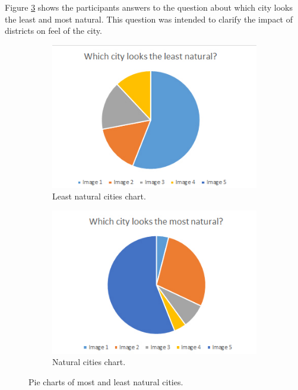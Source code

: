 	Figure \ref{fig:pie-chart-natural-least-natural} shows the participants answers to the question about which city looks the least and most natural. This question was intended to clarify the impact of districts on feel of the city.
	
	\begin{figure}[h]
		\begin{subfigure}{0.5\textwidth}
			\centering
			\includegraphics[width=0.95\linewidth]{"Images/LeastNatural"}
			\caption{Least natural cities chart.}
			\label{fig:pie-chart-least-natural}
		\end{subfigure}
		\begin{subfigure}{0.5\textwidth}
			\centering
			\includegraphics[width=0.95\linewidth]{"Images/Natural"}
			\caption{Natural cities chart.}
			\label{fig:pie-chart-natural}
		\end{subfigure}
		\caption{Pie charts of most and least natural cities.}
		\label{fig:pie-chart-natural-least-natural}
	\end{figure}
	
